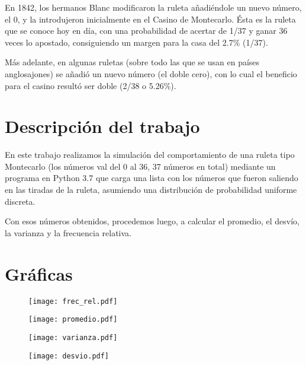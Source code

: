 En 1842, los hermanos Blanc modificaron la ruleta añadiéndole un nuevo número, el 0, y la introdujeron inicialmente en el Casino de Montecarlo. Ésta es la ruleta que se conoce hoy en día, con una probabilidad de acertar de 1/37 y ganar 36 veces lo apostado, consiguiendo un margen para la casa del 2.7\% (1/37).

Más adelante, en algunas ruletas (sobre todo las que se usan en países anglosajones) se añadió un nuevo número (el doble cero), con lo cual el beneficio para el casino resultó ser doble (2/38 o 5.26\%).

\section{Descripción del trabajo}
\label{sec:headings}
En este trabajo realizamos la simulación del comportamiento de una ruleta tipo Montecarlo (los números val del 0 al 36, 37 números en total) mediante un programa en Python 3.7 que carga una lista con los números que fueron saliendo en las tiradas de la ruleta, asumiendo una distribución de probabilidad uniforme discreta.

Con esos números obtenidos, procedemos luego, a calcular el promedio, el desvío, la varianza y la frecuencia relativa.

\section{Gráficas}
\begin{figure}[H]
  \centering
  \texttt{[image: frec\_rel.pdf]}
  \label{fig:frec_rel}
\end{figure}

\begin{figure}[H]
  \centering
  \texttt{[image: promedio.pdf]}
  \label{fig:promedio}
\end{figure}

\begin{figure}[H]
  \centering
  \texttt{[image: varianza.pdf]}
  \label{fig:varianza}
\end{figure}

\begin{figure}[H]
  \centering
  \texttt{[image: desvio.pdf]}
  \label{fig:desvio}
\end{figure}

  

